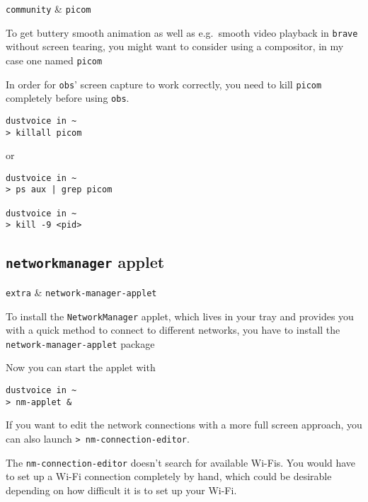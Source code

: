 \documentclass[10pt]{dustdoc}
\begin{document}
\begin{pkgtable}
    \texttt{community} & \texttt{picom} \\
\end{pkgtable}

To get buttery smooth animation as well as e.g.\ smooth video playback in \texttt{brave} without screen tearing, you might want to consider using a compositor, in my case one named \texttt{picom}

\begin{WARNING}
    In order for \texttt{obs}' screen capture to work correctly, you need to kill \texttt{picom} completely before using \texttt{obs}.

    \begin{verbatim}
dustvoice in ~
> killall picom
    \end{verbatim}


    \noindent
    or

    \begin{verbatim}
dustvoice in ~
> ps aux | grep picom

dustvoice in ~
> kill -9 <pid>
    \end{verbatim}

\end{WARNING}

\subsection{\texttt{networkmanager} applet}%
\label{sec:networkmanager-applet}

\begin{pkgtable}
    \texttt{extra} & \texttt{network-manager-applet} \\
\end{pkgtable}

To install the \texttt{NetworkManager} applet, which lives in your tray and provides you with a quick method to connect to different networks, you have to install the \texttt{network-manager-applet} package

Now you can start the applet with

\begin{verbatim}
dustvoice in ~
> nm-applet &
\end{verbatim}


If you want to edit the network connections with a more full screen approach, you can also launch \texttt{> nm-connection-editor}.

\begin{NOTE}
    The \texttt{nm-connection-editor} doesn’t search for available Wi-Fis.
    You would have to set up a Wi-Fi connection completely by hand, which could be desirable depending on how difficult it is to set up your Wi-Fi.
\end{NOTE}
\end{document}
